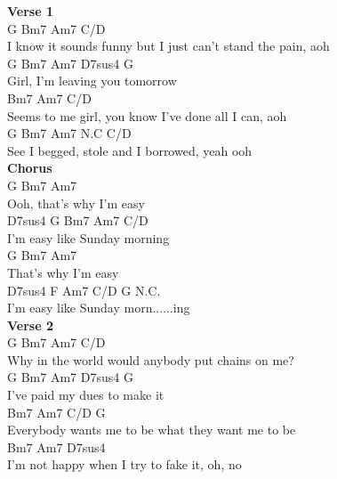 \documentclass[a4paper]{article}
\begin{document}
    {
        \scriptsize
        \textbf{Verse 1}
        ~\\
        {
            \cutive
            \obeyspaces
G                Bm7                    Am7             C/D
\\
I know it sounds funny but I just can't stand the pain, aoh
\\
G            Bm7           Am7   D7sus4  G
\\
Girl, I'm leaving you tomorrow
\\
            Bm7                          Am7    C/D
\\
Seems to me girl, you know I've done all I can, aoh
\\
G     Bm7                    Am7    N.C  C/D
\\
See I begged, stole and I borrowed, yeah ooh
\\

        }
        \textbf{Chorus}
        ~\\
        {
            \cutive
            \obeyspaces
                      G   Bm7   Am7
\\
Ooh, that's why I'm easy
\\
    D7sus4              G    Bm7   Am7   C/D
\\
I'm easy like Sunday morning
\\
                 G   Bm7   Am7
\\
That's why I'm easy
\\
    D7sus4           F Am7 C/D G    N.C.
\\
I'm easy like Sunday morn......ing
\\

        }
        \textbf{Verse 2}
        ~\\
        {
            \cutive
            \obeyspaces
G                Bm7                      Am7    C/D
\\
Why in the world would anybody put chains on me?
\\
G         Bm7             Am7   D7sus4  G
\\
I've paid my dues to make it
\\
                Bm7                     Am7      C/D   G
\\
Everybody wants me to be what they want me to be
\\
           Bm7                   Am7     D7sus4
\\
I'm not happy when I try to fake it, oh, no
\\

}}
\end{document}
